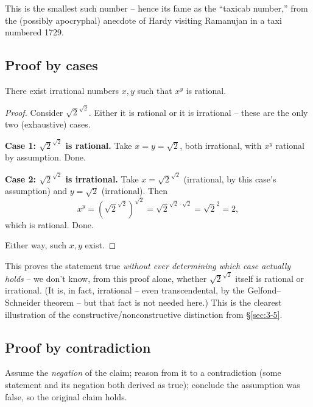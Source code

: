\documentclass[11pt]{article}
\begin{document}
\begin{note}
This is the smallest such number -- hence its fame as the ``taxicab number,'' from the (possibly apocryphal) anecdote of Hardy visiting Ramanujan in a taxi numbered 1729.
\end{note}

\subsection{Proof by cases}
\label{sec:3-8}

\begin{theorem}
There exist irrational numbers $x, y$ such that $x^y$ is rational.
\end{theorem}
\begin{proof}
Consider $\sqrt{2}^{\sqrt{2}}$. Either it is rational or it is irrational -- these are the only two (exhaustive) cases.

\textbf{Case 1: $\sqrt{2}^{\sqrt{2}}$ is rational.} Take $x = y = \sqrt{2}$, both irrational, with $x^y$ rational by assumption. Done.

\textbf{Case 2: $\sqrt{2}^{\sqrt{2}}$ is irrational.} Take $x = \sqrt{2}^{\sqrt{2}}$ (irrational, by this case's assumption) and $y = \sqrt{2}$ (irrational). Then
\[
x^y = \left(\sqrt{2}^{\sqrt{2}}\right)^{\sqrt{2}} = \sqrt{2}^{\sqrt{2}\cdot\sqrt{2}} = \sqrt{2}^2 = 2,
\]
which is rational. Done.

Either way, such $x,y$ exist.
\end{proof}

\begin{note}
This proves the statement true \emph{without ever determining which case actually holds} -- we don't know, from this proof alone, whether $\sqrt2^{\sqrt2}$ itself is rational or irrational. (It is, in fact, irrational -- even transcendental, by the Gelfond--Schneider theorem -- but that fact is not needed here.) This is the clearest illustration of the constructive/nonconstructive distinction from \S\ref{sec:3-5}.
\end{note}

\subsection{Proof by contradiction}
\label{sec:3-9}
\begin{note}[Pattern]
Assume the \emph{negation} of the claim; reason from it to a contradiction (some statement and its negation both derived as true); conclude the assumption was false, so the original claim holds.
\end{note}
\end{document}
